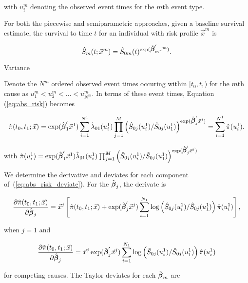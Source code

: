 \documentclass[11pt]{article}
\makeatletter
\newcommand{\bbeta}{\mbox{\boldmath$\beta$}}
\renewcommand{\section}{\@startsection{section}{1}{0mm}
   {\baselineskip}%
   {\baselineskip}{\normalfont\normalsize\scshape}}%
\makeatother
\begin{document}
\noindent with $u^m_{i}$ denoting the observed event times for the $m$th event type.

For both the piecewise and semiparametric approaches, given a baseline survival estimate, the survival to time $t$ for an individual with risk profile $\vec{x}^m$ is

\begin{equation}
\hat{S}_{m}(t;\vec{x}^m) = \hat{S}_{0m}(t)^{\exp ( \hat{\bbeta}_m' \vec{x}^m )}.
\end{equation}

\section{Variance}

Denote the $N^m$ ordered observed event times occuring within $[t_0,t_1)$ for the $m$th cause as $u^m_1 < u^m_2 < \dots < u^m_{N^m}$. In terms of these event times, Equation (\ref{eq:abs_risk}) becomes


\begin{equation}
\hat{\pi}(t_0,t_1; \vec{x}) =  \exp (\hat{\bbeta}_1'\vec{x}^1 )\sum_{i=1}^{N^1} \hat{\lambda}_{01}(u^1_i) \prod_{j=1}^M \left( \hat{S}_{0j}(u^1_i)/\hat{S}_{0j}(u^1_1) \right)^{\exp ( \hat{\bbeta}_j'\vec{x}^j )} = \sum_{i=1}^{N^1} \hat{\pi}(u^1_i).
\label{eq:abs_risk_deviate}
\end{equation}

\noindent with $\hat{\pi}(u^1_i) = \exp ( \hat{\bbeta}_1'\vec{x}^1 ) \hat{\lambda}_{01}(u^1_i) \prod_{j=1}^M \left( \hat{S}_{0j}(u^1_i)/\hat{S}_{0j}(u^1_1) \right)^{\exp (\hat{\bbeta}_j'\vec{x}^j )}$. 

We determine the derivative and deviates for each component of~(\ref{eq:abs_risk_deviate}). For the $\hat{\bbeta}_j$, the derivate is 

\[
\frac{\partial \hat{\pi}(t_0,t_1;\vec{x}) }{\partial \hat{\bbeta}_j} = \vec{x}^j \left[ \hat{\pi}(t_0,t_1;\vec{x}) + \exp ( \hat{\bbeta}_j'\vec{x}^j ) \sum_{i=1}^{N_1} \log\left( \hat{S}_{0j}(u^1_i)/\hat{S}_{0j}(u^1_1) \right) \hat{\pi}(u^1_i) \right],
\]

\noindent when $j=1$ and

\[
\frac{\partial \hat{\pi}(t_0,t_1;\vec{x}) }{\partial \hat{\bbeta}_j} =  \vec{x}^j \exp ( \hat{\bbeta}_j'\vec{x}^j ) \sum_{i=1}^{N_1} \log\left( \hat{S}_{0j}(u^1_i)/\hat{S}_{0j}(u^1_1) \right) \hat{\pi}(u^1_i)
\]

\noindent for competing causes. The Taylor deviates for each $\hat{\bbeta}_m$ are 
\end{document}
